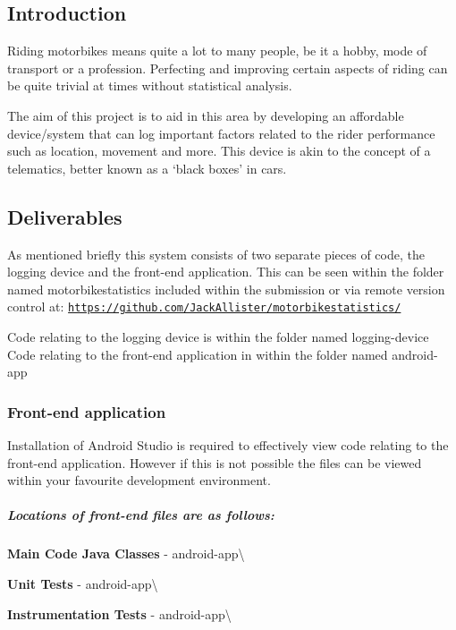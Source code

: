 \subsection*{Introduction}

Riding motorbikes means quite a lot to many people, be it a hobby, mode of transport or a profession. Perfecting and improving certain aspects of riding can be quite trivial at times without statistical analysis.

The aim of this project is to aid in this area by developing an affordable device/system that can log important factors related to the rider performance such as location, movement and more. This device is akin to the concept of a telematics, better known as a ‘black boxes’ in cars.

\subsection*{Deliverables}

As mentioned briefly this system consists of two separate pieces of code, the logging device and the front-\/end application. This can be seen within the folder named \textquotesingle{}motorbikestatistics\textquotesingle{} included within the submission or via remote version control at\+: \href{https://github.com/JackAllister/motorbikestatistics/}{\tt https\+://github.\+com/\+Jack\+Allister/motorbikestatistics/}

Code relating to the logging device is within the folder named \textquotesingle{}logging-\/device\textquotesingle{} Code relating to the front-\/end application in within the folder named \textquotesingle{}android-\/app\textquotesingle{}

\subsubsection*{Front-\/end application}

Installation of Android Studio is required to effectively view code relating to the front-\/end application. However if this is not possible the files can be viewed within your favourite development environment.

\subparagraph*{Locations of front-\/end files are as follows\+:}


\begin{DoxyItemize}
\item {\bfseries Main Code Java Classes} -\/ android-\/app\textbackslash{}
\item {\bfseries Unit Tests} -\/ android-\/app\textbackslash{}
\item {\bfseries Instrumentation Tests} -\/ android-\/app\textbackslash{}
\end{DoxyItemize}

